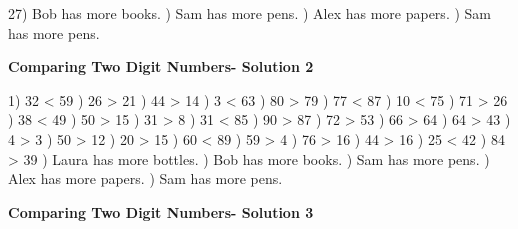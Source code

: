 \documentclass{article}%
\begin{document}
27) Bob has more books.%
) Sam has more pens.%
) Alex has more papers.%
) Sam has more pens.%
\newline%
\newpage%
\large%
\begin{center}%
\textbf{Comparing Two Digit Numbers- Solution 2}%
\newline%
\end{center} \normalsize%
1) 32 < 59%
) 26 > 21%
) 44 > 14%
) 3 < 63%
) 80 > 79%
) 77 < 87%
) 10 < 75%
) 71 > 26%
) 38 < 49%
) 50 > 15%
) 31 > 8%
) 31 < 85%
) 90 > 87%
) 72 > 53%
) 66 > 64%
) 64 > 43%
) 4 > 3%
) 50 > 12%
) 20 > 15%
) 60 < 89%
) 59 > 4%
) 76 > 16%
) 44 > 16%
) 25 < 42%
) 84 > 39%
) Laura has more bottles.%
) Bob has more books.%
) Sam has more pens.%
) Alex has more papers.%
) Sam has more pens.%
\newline%
\newpage%
\large%
\begin{center}%
\textbf{Comparing Two Digit Numbers- Solution 3}%
\newline%
\end{center} \normalsize%
\end{document}

